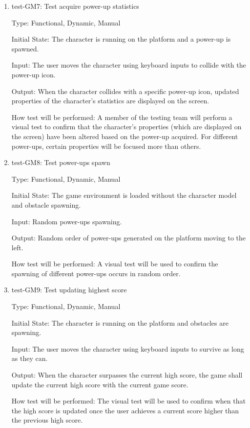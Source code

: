 \documentclass[12pt, titlepage]{article}
\begin{document}
\begin{enumerate}
\item{test-GM7: Test acquire power-up statistics\\}

Type: Functional, Dynamic, Manual
					
Initial State: The character is running on the platform and a power-up is spawned.
					
Input: The user moves the character using keyboard inputs to collide with the power-up icon.

Output: When the character collides with a specific power-up icon, updated properties of the character's statistics are displayed on the screen.
					
How test will be performed: A member of the testing team will perform a visual test to confirm that the character's properties (which are displayed on the screen) have been altered based on the power-up acquired. For different power-ups, certain properties will be focused more than others. 

\item{test-GM8: Test power-ups spawn\\}

Type: Functional, Dynamic, Manual
					
Initial State: The game environment is loaded without the character model and obstacle spawning.
					
Input: Random power-ups spawning.

Output: Random order of power-ups generated on the platform moving to the left.
					
How test will be performed: A visual test will be used to confirm the spawning of different power-ups occurs in random order.


\item{test-GM9: Test updating highest score\\}

Type: Functional, Dynamic, Manual
					
Initial State: The character is running on the platform and obstacles are spawning.
					
Input: The user moves the character using keyboard inputs to survive as long as they can.
					
Output: When the character surpasses the current high score, the game shall update the current high score with the current game score.
					
How test will be performed: The visual test will be used to confirm when that the high score is updated once the user achieves a current score higher than the previous high score.

\end{enumerate}			
\end{document}
